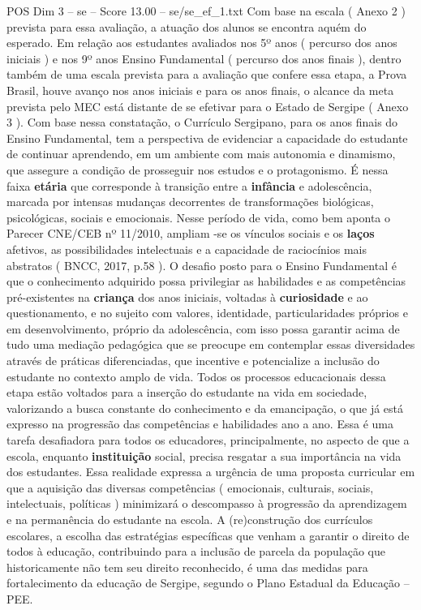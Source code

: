 \begin{textsample}{POS Dim 3 – se – Score 13.00 – se/se\_ef\_1.txt}
Com base na escala ( Anexo 2 ) prevista para essa avaliação, a atuação dos alunos se encontra aquém do esperado.
Em relação aos estudantes avaliados nos 5º anos ( percurso dos anos iniciais ) e nos 9º anos Ensino Fundamental ( percurso dos anos finais ), dentro também de uma escala prevista para a avaliação que confere essa etapa, a Prova Brasil, houve avanço nos anos iniciais e para os anos finais, o alcance da meta prevista pelo MEC está distante de se efetivar para o Estado de Sergipe ( Anexo 3 ).
Com base nessa constatação, o Currículo Sergipano, para os anos finais do Ensino Fundamental, tem a perspectiva de evidenciar a capacidade do estudante de continuar aprendendo, em um ambiente com mais autonomia e dinamismo, que assegure a condição de prosseguir nos estudos e o protagonismo.
É nessa faixa \textbf{etária} que corresponde à transição entre a \textbf{infância} e adolescência, marcada por intensas mudanças decorrentes de transformações biológicas, psicológicas, sociais e emocionais.
Nesse período de vida, como bem aponta o Parecer CNE/CEB nº 11/2010, ampliam -se os vínculos sociais e os \textbf{laços} afetivos, as possibilidades intelectuais e a capacidade de raciocínios mais abstratos ( BNCC, 2017, p.58 ).
O desafio posto para o Ensino Fundamental é que o conhecimento adquirido possa privilegiar as habilidades e as competências pré-existentes na \textbf{criança} dos anos iniciais, voltadas à \textbf{curiosidade} e ao questionamento, e no sujeito com valores, identidade, particularidades próprios e em desenvolvimento, próprio da adolescência, com isso possa garantir acima de tudo uma mediação pedagógica que se preocupe em contemplar essas diversidades através de práticas diferenciadas, que incentive e potencialize a inclusão do estudante no contexto amplo de vida.
Todos os processos educacionais dessa etapa estão voltados para a inserção do estudante na vida em sociedade, valorizando a busca constante do conhecimento e da emancipação, o que já está expresso na progressão das competências e habilidades ano a ano.
Essa é uma tarefa desafiadora para todos os educadores, principalmente, no aspecto de que a escola, enquanto \textbf{instituição} social, precisa resgatar a sua importância na vida dos estudantes.
Essa realidade expressa a urgência de uma proposta curricular em que a aquisição das diversas competências ( emocionais, culturais, sociais, intelectuais, políticas ) minimizará o descompasso à progressão da aprendizagem e na permanência do estudante na escola.
A (re)construção dos currículos escolares, a escolha das estratégias específicas que venham a garantir o direito de todos à educação, contribuindo para a inclusão de parcela da população que historicamente não tem seu direito reconhecido, é uma das medidas para fortalecimento da educação de Sergipe, segundo o Plano Estadual da Educação – PEE.

\end{textsample}
